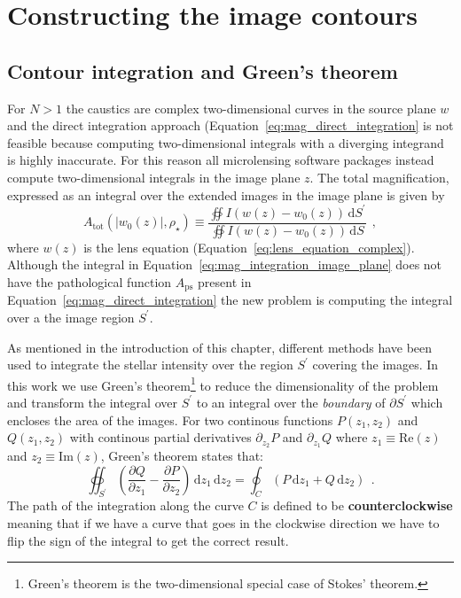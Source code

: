\documentclass[12pt,dvipsnames]{report}
\newcommand{\ud}{\,\mathrm{d}}
\newcommand{\hquad}{~~}
\begin{document}
\section{Constructing the image contours}
\subsection{Contour integration and Green's theorem}
For $N>1$ the caustics are complex two-dimensional curves in the source plane
$w$ and the direct integration approach (Equation~\ref{eq:mag_direct_integration} is not 
feasible because computing two-dimensional integrals with a diverging integrand is 
highly inaccurate. For this reason all microlensing software packages instead 
compute two-dimensional integrals in the image plane $z$. The total magnification, 
expressed as an integral over the extended images in the image plane is given by
\begin{equation}
    A_\mathrm{tot}(|w_0(z)|,\rho_\star)\equiv \frac{\oiint I(w(z) - w_0(z))\ud S^\prime}{
        \oiint I(w(z) - w_0(z))\ud S}\hquad,
    \label{eq:mag_integration_image_plane}
\end{equation}
where $w(z)$ is the lens equation (Equation~\ref{eq:lens_equation_complex}).
Although the integral in Equation~\ref{eq:mag_integration_image_plane} does not have the
pathological function $A_\mathrm{ps}$ present in Equation~\ref{eq:mag_direct_integration} 
the new problem is computing the integral over a the image region $S^\prime$.

As mentioned in the introduction of this chapter, different methods have been used to 
integrate the stellar intensity over the region $S^\prime$ covering the images. 
In this work we use Green's theorem\footnote{Green's theorem is the two-dimensional special case of
    Stokes' theorem.} to reduce the dimensionality of the problem and transform the
integral over $S^\prime$ to an integral over the \emph{boundary} of $\partial S^\prime$ 
which encloses the area of the images.
For two continous functions $P(z_1, z_2)$ and $Q(z_1, z_2)$
with continous partial derivatives $\partial_{z_2}P$ and $\partial_{z_1}Q$ where 
$z_1\equiv\mathrm{Re}(z)$ and $z_2\equiv\mathrm{Im}(z)$, Green's theorem states that:
\begin{equation}
    \oiint_{{S}^\prime}\left(\frac{\partial Q}{\partial z_{1}}-
    \frac{\partial P}{\partial z_{2}} \right) \ud z_{1} \ud z_{2}= \oint_{C} (P \ud z_{1}+Q \ud
    z_{2})\hquad . \label{eq:green_theorem}
\end{equation}
The path of the integration along the curve $C$ is defined to be
\textbf{counterclockwise} meaning that if we have a curve that goes in the clockwise
direction we have to flip the sign of the integral to get the correct result.
\end{document}
